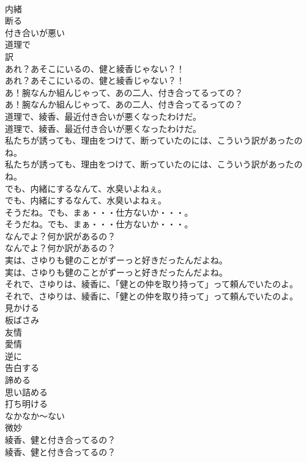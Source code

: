 \documentclass[8pt]{extreport}
\begin{document}
\begin{CJK}{UTF8}{min}
\\	内緒
\\	断る
\\	付き合いが悪い
\\	道理で
\\	訳
\\	あれ？あそこにいるの、健と綾香じゃない？！	
\\	あれ？あそこにいるの、健と綾香じゃない？！ 
\\	あ！腕なんか組んじゃって、あの二人、付き合ってるっての？	
\\	あ！腕なんか組んじゃって、あの二人、付き合ってるっての？ 
\\	道理で、綾香、最近付き合いが悪くなったわけだ。	
\\	道理で、綾香、最近付き合いが悪くなったわけだ。 
\\	私たちが誘っても、理由をつけて、断っていたのには、こういう訳があったのね。	
\\	私たちが誘っても、理由をつけて、断っていたのには、こういう訳があったのね。 
\\	でも、内緒にするなんて、水臭いよねぇ。	
\\	でも、内緒にするなんて、水臭いよねぇ。 
\\	そうだね。でも、まぁ・・・仕方ないか・・・。	
\\	そうだね。でも、まぁ・・・仕方ないか・・・。 
\\	なんでよ？何か訳があるの？	
\\	なんでよ？何か訳があるの？ 
\\	実は、さゆりも健のことがずーっと好きだったんだよね。	
\\	実は、さゆりも健のことがずーっと好きだったんだよね。 
\\	それで、さゆりは、綾香に、「健との仲を取り持って」って頼んでいたのよ。	
\\	それで、さゆりは、綾香に、「健との仲を取り持って」って頼んでいたのよ。 
\\	見かける
\\	板ばさみ
\\	友情
\\	愛情
\\	逆に
\\	告白する
\\	諦める
\\	思い詰める
\\	打ち明ける
\\	なかなか～ない
\\	微妙
\\	綾香、健と付き合ってるの？	
\\	綾香、健と付き合ってるの？ 

\end{CJK}
\end{document}
